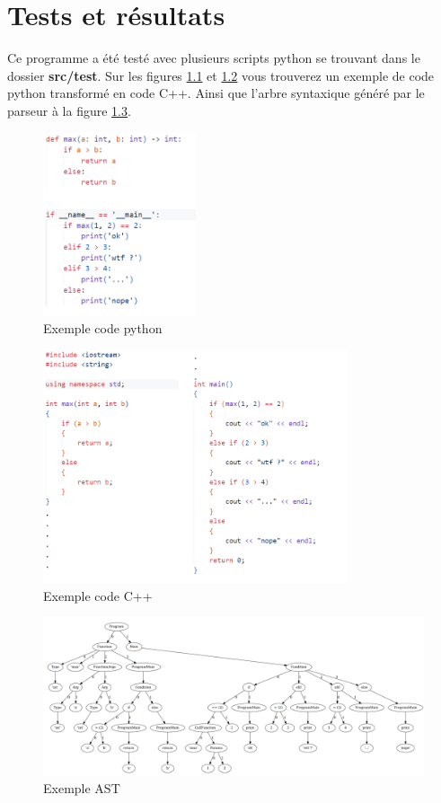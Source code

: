 \chapter{Tests et résultats}

Ce programme a été testé avec plusieurs scripts python se trouvant dans le dossier \textbf{src/test}.
Sur les figures \ref{exemple_python} et \ref{exemple_cpp} vous trouverez un exemple de code python transformé en code C++.
Ainsi que l'arbre syntaxique généré par le parseur à la figure \ref{exemple_ast}.

\begin{figure}[h]
    \centering
    \includegraphics[width=0.4\textwidth]{./images/exemple_python.png}
    \caption{Exemple code python}\label{exemple_python}
\end{figure}

\begin{figure}[h]
    \centering
    \includegraphics[width=0.8\textwidth]{./images/exemple_cpp.png}
    \caption{Exemple code C++}\label{exemple_cpp}
\end{figure}

\begin{figure}[h]
    \centering
    \includegraphics[width=1\textwidth]{./images/exemple_ast.png}
    \caption{Exemple AST}\label{exemple_ast}
\end{figure}

